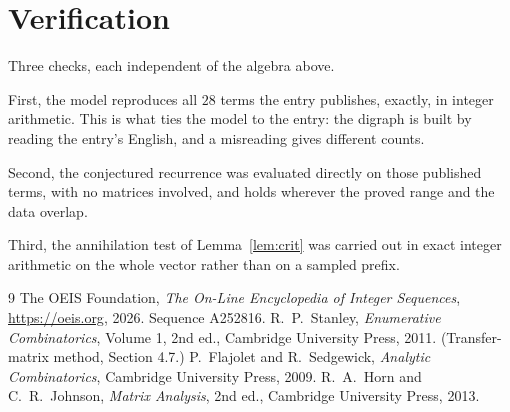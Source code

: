 \documentclass[11pt,a4paper]{article}
\theoremstyle{plain}
\theoremstyle{definition}
\begin{document}
\section{Verification}

Three checks, each independent of the algebra above.

First, the model reproduces all $28$ terms the entry publishes, exactly, in integer
arithmetic. This is what ties the model to the entry: the digraph is built by reading the
entry's English, and a misreading gives different counts.

Second, the conjectured recurrence was evaluated directly on those published terms, with no
matrices involved, and holds wherever the proved range and the data overlap.

Third, the annihilation test of Lemma~\ref{lem:crit} was carried out in exact integer
arithmetic on the whole vector rather than on a sampled prefix.

\begin{thebibliography}{9}
 The OEIS Foundation, \emph{The On-Line Encyclopedia of Integer
Sequences}, \url{https://oeis.org}, 2026. Sequence A252816.
 R.~P.~Stanley, \emph{Enumerative Combinatorics}, Volume 1, 2nd ed.,
Cambridge University Press, 2011. (Transfer-matrix method, Section 4.7.)
 P.~Flajolet and R.~Sedgewick, \emph{Analytic Combinatorics}, Cambridge
University Press, 2009.
 R.~A.~Horn and C.~R.~Johnson, \emph{Matrix Analysis}, 2nd ed., Cambridge
University Press, 2013.
\end{thebibliography}
\end{document}
